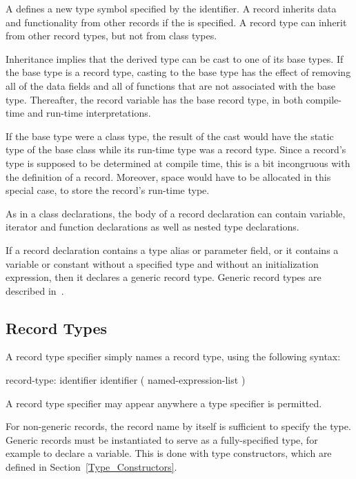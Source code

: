 A  defines a new type symbol specified by the
identifier.  A record inherits data and functionality from other records
if the  is specified.  A record type can inherit from
other record types, but not from class types.

\begin{rationale}
Inheritance implies that the derived type can be cast to one of its base types.
If the base type is a record type, casting to the base type has the effect of
removing all of the data fields and all of functions that are not associated
with the base type.  Thereafter, the record variable has the base record type,
in both compile-time and run-time interpretations.

If the base type were a class type, the result of the cast would have the static
type of the base class while its run-time type was a record type.  Since a
record's type is supposed to be determined at compile time, this is a bit
incongruous with the definition of a record.  Moreover, space would have to be
allocated in this special case, to store the record's run-time type.
\end{rationale}

As in a class declarations, the body of a record declaration can contain
variable, iterator and function declarations as well as nested type declarations.

If a record declaration contains a type alias or parameter field, or it contains
a variable or constant without a specified type and without an initialization
expression, then it declares a generic record type.  Generic record types are
described in~.

\subsection{Record Types}
\label{Record_Types}

A record type specifier simply names a record type, using
the following syntax:
\begin{syntax}
record-type:
  identifier
  identifier ( named-expression-list )
\end{syntax}
A record type specifier may appear anywhere a type specifier is permitted.

For non-generic records, the record name by itself is sufficient to specify the
type.  Generic records must be instantiated to serve as a fully-specified
type, for example to declare a variable.  This is done with
type constructors, which are defined in Section~\ref{Type_Constructors}.

